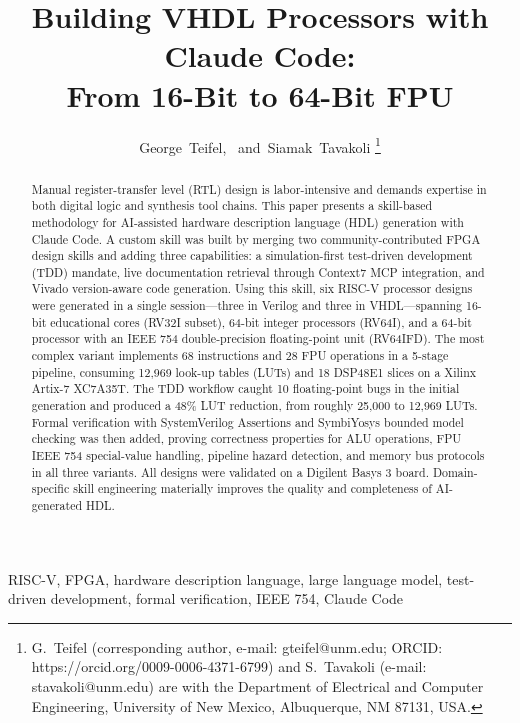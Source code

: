 \documentclass[journal]{IEEEtran}
\begin{document}
\title{Building VHDL Processors with Claude Code:\\From 16-Bit to 64-Bit FPU}

\author{George~Teifel,~\IEEEmembership{}
        and~Siamak~Tavakoli%
\thanks{G.~Teifel (corresponding author, e-mail: gteifel@unm.edu; ORCID: https://orcid.org/0009-0006-4371-6799) and S.~Tavakoli (e-mail: stavakoli@unm.edu) are with the Department of Electrical and Computer Engineering, University of New Mexico, Albuquerque, NM 87131, USA.}%
}

\maketitle

\begin{abstract}
Manual register-transfer level (RTL) design is labor-intensive and demands expertise in both digital logic and synthesis tool chains. This paper presents a skill-based methodology for AI-assisted hardware description language (HDL) generation with Claude Code. A custom skill was built by merging two community-contributed FPGA design skills and adding three capabilities: a simulation-first test-driven development (TDD) mandate, live documentation retrieval through Context7 MCP integration, and Vivado version-aware code generation. Using this skill, six RISC-V processor designs were generated in a single session---three in Verilog and three in VHDL---spanning 16-bit educational cores (RV32I subset), 64-bit integer processors (RV64I), and a 64-bit processor with an IEEE 754 double-precision floating-point unit (RV64IFD). The most complex variant implements 68 instructions and 28 FPU operations in a 5-stage pipeline, consuming 12,969 look-up tables (LUTs) and 18 DSP48E1 slices on a Xilinx Artix-7 XC7A35T. The TDD workflow caught 10 floating-point bugs in the initial generation and produced a 48\% LUT reduction, from roughly 25,000 to 12,969 LUTs. Formal verification with SystemVerilog Assertions and SymbiYosys bounded model checking was then added, proving correctness properties for ALU operations, FPU IEEE 754 special-value handling, pipeline hazard detection, and memory bus protocols in all three variants. All designs were validated on a Digilent Basys 3 board. Domain-specific skill engineering materially improves the quality and completeness of AI-generated HDL.
\end{abstract}

\begin{IEEEkeywords}
RISC-V, FPGA, hardware description language, large language model, test-driven development, formal verification, IEEE 754, Claude Code
\end{IEEEkeywords}
\end{document}
